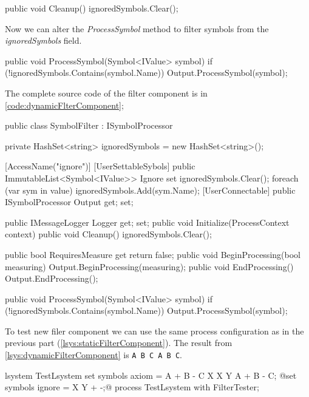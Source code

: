 \begin{Csharp}
public void Cleanup() {
	ignoredSymbols.Clear();
}
\end{Csharp}

Now we can alter the \emph{ProcessSymbol} method to filter symbols from the \emph{ignoredSymbols} field.

\begin{Csharp}
public void ProcessSymbol(Symbol<IValue> symbol) {
	if (!ignoredSymbols.Contains(symbol.Name)) {
		Output.ProcessSymbol(symbol);
	}
}
\end{Csharp}

The complete source code of the filter component is in \autoref{code:dynamicFlterComponent};


\begin{CsharpBreak}[label=code:dynamicFlterComponent,caption={Filter component with static filtering}]
public class SymbolFilter : ISymbolProcessor {

	private HashSet<string> ignoredSymbols = new HashSet<string>();

	[AccessName("ignore")]
	[UserSettableSybols]
	public ImmutableList<Symbol<IValue>> Ignore {
		set {
			ignoredSymbols.Clear();
			foreach (var sym in value) {
				ignoredSymbols.Add(sym.Name);
			}
		}
	}
	[UserConnectable]
	public ISymbolProcessor Output { get; set; }

	public IMessageLogger Logger { get; set; }
	public void Initialize(ProcessContext context) { }
	public void Cleanup() {
		ignoredSymbols.Clear();
	}
	
	public bool RequiresMeasure { get { return false; } }
	public void BeginProcessing(bool measuring) {
		Output.BeginProcessing(measuring);
	}
	public void EndProcessing() {
		Output.EndProcessing();
	}
	
	public void ProcessSymbol(Symbol<IValue> symbol) {
		if (!ignoredSymbols.Contains(symbol.Name)) {
			Output.ProcessSymbol(symbol);
		}
	}
}
\end{CsharpBreak}

To test new filer component we can use the same process configuration as in the previous part (\autoref{lsys:staticFilterComponent}).
The result from \autoref{lsys:dynamicFilterComponent} is \texttt{A B C A B C}.

\begin{Lsystem}[label=lsys:dynamicFilterComponent,caption={\lsystem code for testing improved filter component}]
lsystem TestLsystem {
	set symbols axiom = A + B - C X X Y A + B - C;
	@set symbols ignore = X Y + -;@
}
process TestLsystem with FilterTester;
\end{Lsystem}


